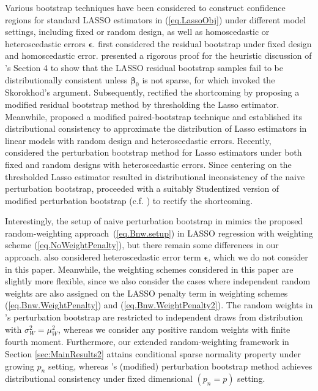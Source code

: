 \documentclass[ejs,authoryear,linksfromyear]{imsart}
\numberwithin{equation}{section}
\theoremstyle{plain}
\begin{document}
Various bootstrap techniques have been considered to construct confidence regions for standard LASSO estimators in (\ref{eq.LassoObj}) under different model settings, including fixed or random design, as well as homoscedastic or heteroscedastic errors $\bm{\epsilon}$. \citet{Knight&Fu} first considered the residual bootstrap under fixed design and homoscedastic error. \citet{Chatterjee2010} presented a rigorous proof for the heuristic discussion of \citet{Knight&Fu}'s Section 4 to show that the LASSO residual bootstrap samples fail to be distributionally consistent unless $\bm{\beta}_0$ is not sparse, for which \citet{Knight&Fu} invoked the Skorokhod's argument. Subsequently, \citet{Chatterjee2011Jasa} rectified the shortcoming by proposing a modified residual bootstrap method by thresholding the Lasso estimator. Meanwhile, \citet{Camponovo2015} proposed a modified paired-bootstrap technique and established its distributional consistency to approximate the distribution of Lasso estimators in linear models with random design and heteroscedastic errors. Recently, \citet{Das2019} considered the perturbation bootstrap method for Lasso estimators under both fixed and random designs with heteroscedastic errors. Since centering on the thresholded Lasso estimator \citep[c.f.][]{Chatterjee2011Jasa} resulted in distributional inconsistency of the naive perturbation bootstrap, \citet{Das2019} proceeded with a suitably Studentized version of modified perturbation bootstrap (c.f. \citet{DasGreg2019}) to rectify the shortcoming.                  

Interestingly, the setup of naive perturbation bootstrap in \citet{Das2019} mimics the proposed random-weighting approach~(\ref{eq.Bnw.setup}) in LASSO regression with weighting scheme (\ref{eq.NoWeightPenalty}), but there remain some differences in our approach. 
\citet{Das2019} also considered heteroscedastic error term $\bm{\epsilon}$, which we do not consider in this paper. Meanwhile, the weighting schemes considered in this paper are slightly more flexible, since we also consider the cases where independent random weights are also assigned on the LASSO penalty term in weighting schemes (\ref{eq.Bnw.WeightPenalty}) and (\ref{eq.Bnw.WeightPenalty2}). The random weights in \citet{Das2019}'s perturbation bootstrap are restricted to independent draws from distribution with $\sigma^2_W = \mu_W^2$, whereas we consider any positive random weights with finite fourth moment. Furthermore, our extended random-weighting framework in Section \ref{sec:MainResults2} attains conditional sparse normality property under growing $p_n$ setting, whereas \citet{Das2019}'s (modified) perturbation bootstrap method achieves distributional consistency under fixed dimensional $(p_n = p)$ setting.       
      
\end{document}
